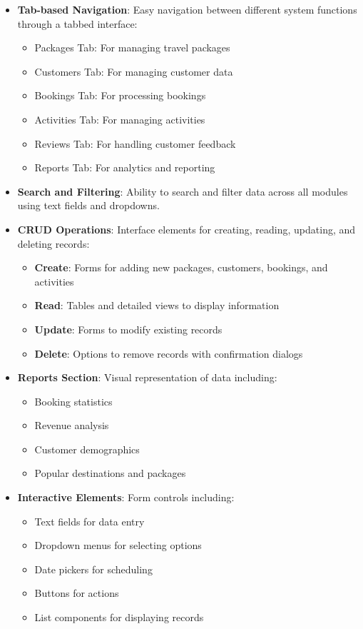 \documentclass[12pt]{article}
\begin{document}
\begin{itemize}
    \item \textbf{Tab-based Navigation}: Easy navigation between different system functions through a tabbed interface:
    \begin{itemize}
        \item Packages Tab: For managing travel packages
        \item Customers Tab: For managing customer data
        \item Bookings Tab: For processing bookings
        \item Activities Tab: For managing activities
        \item Reviews Tab: For handling customer feedback
        \item Reports Tab: For analytics and reporting
    \end{itemize}
    
    \item \textbf{Search and Filtering}: Ability to search and filter data across all modules using text fields and dropdowns.
    
    \item \textbf{CRUD Operations}: Interface elements for creating, reading, updating, and deleting records:
    \begin{itemize}
        \item \textbf{Create}: Forms for adding new packages, customers, bookings, and activities
        \item \textbf{Read}: Tables and detailed views to display information
        \item \textbf{Update}: Forms to modify existing records
        \item \textbf{Delete}: Options to remove records with confirmation dialogs
    \end{itemize}
    
    \item \textbf{Reports Section}: Visual representation of data including:
    \begin{itemize}
        \item Booking statistics
        \item Revenue analysis
        \item Customer demographics
        \item Popular destinations and packages
    \end{itemize}
    
    \item \textbf{Interactive Elements}: Form controls including:
    \begin{itemize}
        \item Text fields for data entry
        \item Dropdown menus for selecting options
        \item Date pickers for scheduling
        \item Buttons for actions
        \item List components for displaying records
    \end{itemize}
\end{itemize}
\end{document}
